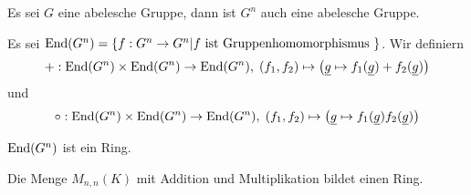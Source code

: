\documentclass[../Algebra_script.tex]{subfiles}
\begin{document}
Es sei $G$ eine abelesche Gruppe, dann ist $G^n$ auch eine abelesche Gruppe.

\begin{definition}
	Es sei $\operatorname{End}(G^n) = \{f : G^n \to G^n | f \text{ ist Gruppenhomomorphismus } \}$. Wir definiern
	\[+ : \operatorname{End}(G^n) \times \operatorname{End}(G^n) \to \operatorname{End}(G^n), \; (f_1, f_2) \mapsto \big(\underline{g} \mapsto f_1(\underline{g}) + f_2(\underline{g})\big)\]
	und
	\[\circ : \operatorname{End}(G^n) \times \operatorname{End}(G^n) \to \operatorname{End}(G^n), \; (f_1, f_2) \mapsto \big(\underline{g} \mapsto f_1(\underline{g})f_2(\underline{g})\big)\]
\end{definition}

\begin{proposition}
	$\operatorname{End}(G^n)$ ist ein Ring.
\end{proposition}

\begin{proposition}
	Die Menge $M_{n,n}(K)$ mit Addition und Multiplikation bildet einen Ring.
\end{proposition}
\end{document}
